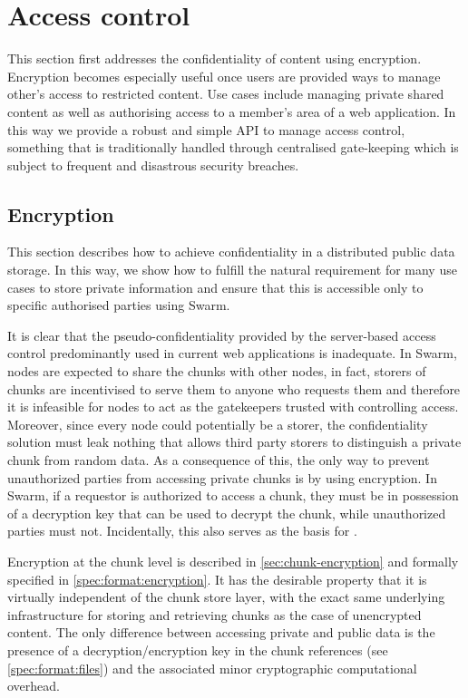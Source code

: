 \section{Access control\statusgreen}\label{sec:access-control}

\green{}

This section first addresses the confidentiality of content using encryption. Encryption becomes especially useful once users are provided ways to manage other's access to restricted content. Use cases include managing private shared content as well as authorising access to a member's area of a web application. In this way we provide a robust and simple API to manage access control, something that is traditionally handled through centralised gate-keeping which is subject to frequent and disastrous security breaches.

\subsection{Encryption\statusgreen}\label{sec:encryption}

This section describes how to achieve confidentiality in a distributed public data storage. In this way, we show how to fulfill the natural requirement for many use cases to store private information and ensure that this is accessible only to specific authorised parties using Swarm. 

It is clear that the pseudo-confidentiality provided by the server-based access control predominantly used in current web applications is inadequate. In Swarm, nodes are expected to share the chunks with other nodes, in fact, storers of chunks are incentivised to serve them to anyone who requests them and therefore it is infeasible for nodes to act as the gatekeepers trusted with controlling access. Moreover, since every node could potentially be a storer, the confidentiality solution must leak nothing that allows third party storers to distinguish a private chunk from random data. As a consequence of this, the only way to prevent unauthorized parties from accessing private chunks is by using encryption. In Swarm, if a requestor is authorized to access a chunk, they must be in possession of a decryption key that can be used to decrypt the chunk, while unauthorized parties must not. Incidentally, this also serves as the basis for .

Encryption at the chunk level is described in \ref{sec:chunk-encryption} and formally specified in \ref{spec:format:encryption}. It 
has the desirable property that it is virtually independent of the chunk store layer, with the exact same underlying infrastructure for storing and retrieving chunks as the case of unencrypted content.
The only difference between accessing private and public data is the presence of a decryption/encryption key in the chunk references (see \ref{spec:format:files}) and the associated minor cryptographic computational overhead.

